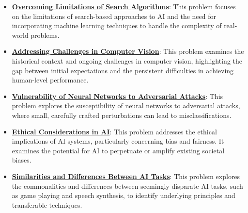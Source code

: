 \documentclass{article}%
\begin{document}
\begin{itemize}[leftmargin=*]
\item \href{\url{https://purdue.brightspace.com/d2l/common/assets/pdfjs-d2l-dist/1.0.14-legacy/web/viewer.html?file=\%252Fcontent\%252Fenforced\%252F1095467-wl.202510.CS.24300.001\%252F02L2-Intro.pdf\%253Fou\%253D1095467\&lang=en-us\&container=d2l-fileviewer-rendered-pdf\&fullscreen=d2l-fileviewer-rendered-pdf-dialog\&height=667}#page=12}{\textbf{Overcoming Limitations of Search Algorithms}}: This problem focuses on the limitations of search-based approaches to AI and the need for incorporating machine learning techniques to handle the complexity of real-world problems.%
\item \href{\url{https://purdue.brightspace.com/d2l/common/assets/pdfjs-d2l-dist/1.0.14-legacy/web/viewer.html?file=\%252Fcontent\%252Fenforced\%252F1095467-wl.202510.CS.24300.001\%252F02L2-Intro.pdf\%253Fou\%253D1095467\&lang=en-us\&container=d2l-fileviewer-rendered-pdf\&fullscreen=d2l-fileviewer-rendered-pdf-dialog\&height=667}#page=15}{\textbf{Addressing Challenges in Computer Vision}}: This problem examines the historical context and ongoing challenges in computer vision, highlighting the gap between initial expectations and the persistent difficulties in achieving human-level performance.%
\item \href{\url{https://purdue.brightspace.com/d2l/common/assets/pdfjs-d2l-dist/1.0.14-legacy/web/viewer.html?file=\%252Fcontent\%252Fenforced\%252F1095467-wl.202510.CS.24300.001\%252F02L2-Intro.pdf\%253Fou\%253D1095467\&lang=en-us\&container=d2l-fileviewer-rendered-pdf\&fullscreen=d2l-fileviewer-rendered-pdf-dialog\&height=667}#page=19}{\textbf{Vulnerability of Neural Networks to Adversarial Attacks}}: This problem explores the susceptibility of neural networks to adversarial attacks, where small, carefully crafted perturbations can lead to misclassifications.%
\item \href{\url{https://purdue.brightspace.com/d2l/common/assets/pdfjs-d2l-dist/1.0.14-legacy/web/viewer.html?file=\%252Fcontent\%252Fenforced\%252F1095467-wl.202510.CS.24300.001\%252F02L2-Intro.pdf\%253Fou\%253D1095467\&lang=en-us\&container=d2l-fileviewer-rendered-pdf\&fullscreen=d2l-fileviewer-rendered-pdf-dialog\&height=667}#page=20}{\textbf{Ethical Considerations in AI}}: This problem addresses the ethical implications of AI systems, particularly concerning bias and fairness. It examines the potential for AI to perpetuate or amplify existing societal biases.%
\item \href{\url{https://purdue.brightspace.com/d2l/common/assets/pdfjs-d2l-dist/1.0.14-legacy/web/viewer.html?file=\%252Fcontent\%252Fenforced\%252F1095467-wl.202510.CS.24300.001\%252F02L2-Intro.pdf\%253Fou\%253D1095467\&lang=en-us\&container=d2l-fileviewer-rendered-pdf\&fullscreen=d2l-fileviewer-rendered-pdf-dialog\&height=667}#page=31}{\textbf{Similarities and Differences Between AI Tasks}}: This problem explores the commonalities and differences between seemingly disparate AI tasks, such as game playing and speech synthesis, to identify underlying principles and transferable techniques.%

\end{itemize}
\end{document}
